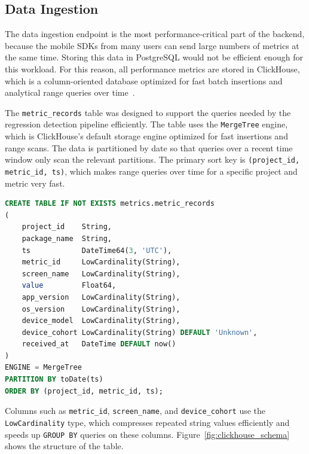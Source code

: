 \subsection{Data Ingestion}
\label{sec:ingestion}

The data ingestion endpoint is the most performance-critical part of the backend, because the mobile SDKs from many users can send large numbers of metrics at the same time. Storing this data in PostgreSQL would not be efficient enough for this workload. For this reason, all performance metrics are stored in ClickHouse, which is a column-oriented database optimized for fast batch insertions and analytical range queries over time~\cite{schulze2024clickhouse}.

The \texttt{metric\_records} table was designed to support the queries needed by the regression detection pipeline efficiently. The table uses the \texttt{MergeTree} engine, which is ClickHouse's default storage engine optimized for fast insertions and range scans. The data is partitioned by date so that queries over a recent time window only scan the relevant partitions. The primary sort key is \texttt{(project\_id, metric\_id, ts)}, which makes range queries over time for a specific project and metric very fast.

\begin{lstlisting}[language=SQL, caption={ClickHouse metric\_records table schema}]
CREATE TABLE IF NOT EXISTS metrics.metric_records
(
    project_id    String,
    package_name  String,
    ts            DateTime64(3, 'UTC'),
    metric_id     LowCardinality(String),
    screen_name   LowCardinality(String),
    value         Float64,
    app_version   LowCardinality(String),
    os_version    LowCardinality(String),
    device_model  LowCardinality(String),
    device_cohort LowCardinality(String) DEFAULT 'Unknown',
    received_at   DateTime DEFAULT now()
)
ENGINE = MergeTree
PARTITION BY toDate(ts)
ORDER BY (project_id, metric_id, ts);
\end{lstlisting}

Columns such as \texttt{metric\_id}, \texttt{screen\_name}, and \texttt{device\_cohort} use the \texttt{LowCardinality} type, which compresses repeated string values efficiently and speeds up \texttt{GROUP BY} queries on these columns. Figure~\ref{fig:clickhouse_schema} shows the structure of the table.


